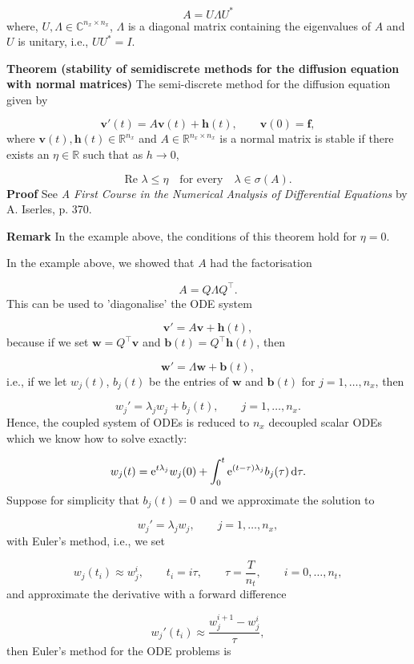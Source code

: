 \documentclass[12pt,a4paper]{article}
\begin{document}
\[
A = U \Lambda U^*
\]
where, $U, \Lambda \in \mathbb{C}^{n_x \times n_x}$, $\Lambda$ is a diagonal matrix containing the eigenvalues of $A$ and $U$ is unitary, i.e., $UU^* = I$.

\textbf{Theorem (stability of semidiscrete methods for the diffusion equation with normal matrices)} The semi-discrete method for the diffusion equation given by  

\[
\mathbf{v}'(t) = A\mathbf{v}(t) + \mathbf{h}(t), \qquad \mathbf{v}(0) = \mathbf{f}, 
\]
where $\mathbf{v}(t), \mathbf{h}(t) \in \mathbb{R}^{n_x}$ and  $A \in \mathbb{R}^{n_x \times n_x}$ is a normal matrix is stable if there exists an $\eta \in \mathbb{R}$ such that as $h \to 0$,

\[
\text{Re } \lambda \leq \eta \quad \text{for every} \quad \lambda \in \sigma(A).
\]
\textbf{Proof}  See \emph{A First Course in the Numerical Analysis of Differential Equations} by A. Iserles, p. 370.

\textbf{Remark} In the example above, the conditions of this theorem hold for $\eta = 0$.

In the example above, we showed that $A$ had the factorisation

\[
A = Q\Lambda Q^{\top}.
\]
This can be used to 'diagonalise' the ODE system

\[
\mathbf{v}' = A\mathbf{v} + \mathbf{h}(t),
\]
because if we set $\mathbf{w} = Q^{\top}\mathbf{v}$ and $\mathbf{b}(t) = Q^{\top}\mathbf{h}(t)$, then

\[
\mathbf{w}' = \Lambda \mathbf{w} + \mathbf{b}(t), 
\]
i.e., if we let $w_j(t)$, $b_j(t)$ be the entries of $\mathbf{w}$ and $\mathbf{b}(t)$ for $j = 1, \ldots, n_x$, then

\[
w_j' = \lambda_j w_j + b_j(t), \qquad j = 1, \ldots, n_x.
\]
Hence, the coupled system of ODEs is reduced to $n_x$ decoupled scalar ODEs which we know how to solve exactly:

\[
w_j(t) = {\rm e}^{t\lambda_j}w_j(0) + \int_0^t {\rm e}^{(t - \tau)\lambda_j}b_j(\tau)\,{\rm d}\tau.
\]
Suppose for simplicity that $b_j(t) = 0$ and we approximate the solution to 

\[
w_j' = \lambda_j w_j, \qquad j = 1, \ldots, n_x,
\]
with Euler's method, i.e., we set

\[
w_j(t_i) \approx w_j^i, \qquad t_i = i\tau, \qquad \tau = \frac{T}{n_t}, \qquad i = 0, \ldots, n_t,
\]
and approximate the derivative with a forward difference

\[
w_j'(t_i) \approx \frac{w^{i+1}_j - w^i_j}{\tau},
\]
then Euler's method for the ODE problems is
\end{document}
